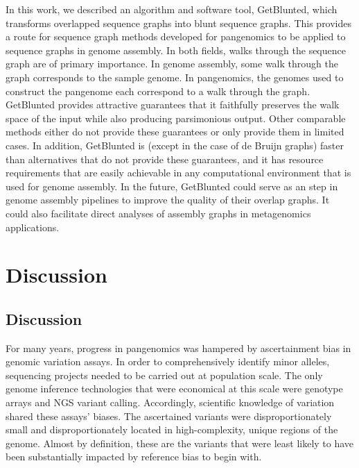 \documentclass[11pt]{ucthesis}
\begin{document}
In this work, we described an algorithm and software tool, GetBlunted, which transforms overlapped sequence graphs into blunt sequence graphs. 
This provides a route for sequence graph methods developed for pangenomics to be applied to sequence graphs in genome assembly.
In both fields, walks through the sequence graph are of primary importance.
In genome assembly, some walk through the graph corresponds to the sample genome.
In pangenomics, the genomes used to construct the pangenome each correspond to a walk through the graph.
GetBlunted provides attractive guarantees that it faithfully preserves the walk space of the input while also producing parsimonious output.
Other comparable methods either do not provide these guarantees or only provide them in limited cases.
In addition, GetBlunted is (except in the case of de Bruijn graphs) faster than alternatives that do not provide these guarantees, and it has resource requirements that are easily achievable in any computational environment that is used for genome assembly.
In the future, GetBlunted could serve as an step in genome assembly pipelines to improve the quality of their overlap graphs.
It could also facilitate direct analyses of assembly graphs in metagenomics applications.

\part{Discussion}

\chapter{Discussion}
\label{chapter:discussion}


For many years, progress in pangenomics was hampered by ascertainment bias in genomic variation assays. In order to comprehensively identify minor alleles, sequencing projects needed to be carried out at population scale. The only genome inference technologies that were economical at this scale were genotype arrays and NGS variant calling. Accordingly, scientific knowledge of variation shared these assays' biases. The ascertained variants were disproportionately small and disproportionately located in high-complexity, unique regions of the genome. Almost by definition, these are the variants that were least likely to have been substantially impacted by reference bias to begin with.
\end{document}
